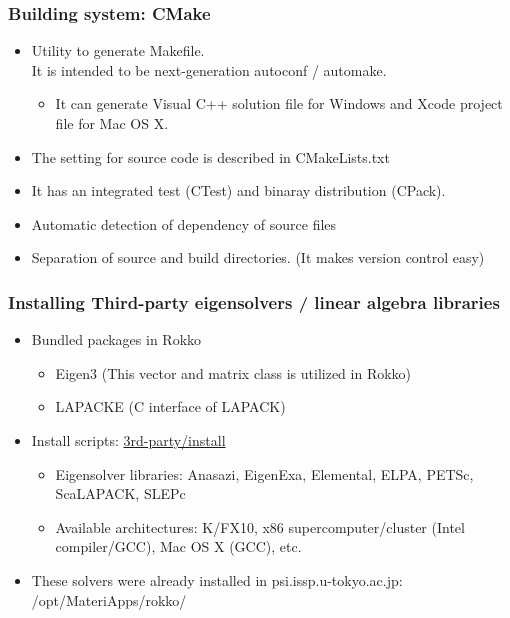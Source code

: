 \begin{frame}
  \frametitle{Building system: CMake}
  \begin{itemize}
    \setlength{\itemsep}{1em}
  \item Utility to generate Makefile.\\
  It is intended to be next-generation autoconf / automake.
    \begin{itemize}
    \item It can generate Visual C++ solution file for Windows and Xcode project file for Mac OS X.
    \end{itemize}
  \item The setting for source code is described in CMakeLists.txt
  \item It has an integrated test (CTest) and binaray distribution (CPack).
  \item Automatic detection of dependency of source files
  \item Separation of source and build directories. (It makes version control easy)
  \end{itemize}
\end{frame}


\begin{frame}
  \frametitle{Installing Third-party eigensolvers / linear algebra libraries}
  \begin{itemize}
  \item Bundled packages in Rokko
    \begin{itemize}
    \item Eigen3 (This vector and matrix class is utilized in Rokko)
    \item LAPACKE (C interface of LAPACK)
    \end{itemize}
  \item Install scripts: \href{https://github.com/t-sakashita/rokko/tree/master/3rd-party/install}{3rd-party/install}
    \begin{itemize}
      \item Eigensolver libraries: Anasazi, EigenExa, Elemental, ELPA, PETSc, ScaLAPACK, SLEPc
      \item Available architectures: K/FX10, x86 supercomputer/cluster (Intel compiler/GCC), Mac OS X (GCC), etc.
    \end{itemize}
  \item These solvers were already installed in psi.issp.u-tokyo.ac.jp:
/opt/MateriApps/rokko/
  \end{itemize}
\end{frame}

